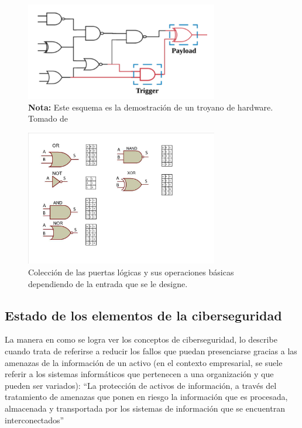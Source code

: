 \begin{figure}[htb]
  \centering
  \includegraphics[width=0.75\textwidth]{./pictures/circuit.png}
  \caption{
    \textbf{Nota:} Este esquema es la demostración de un troyano de hardware.
    Tomado de \cite{Chen2023}}
  \label{fig:circuit}
\end{figure} 

\begin{figure}[htb]
  \centering
  \includegraphics[width=0.75\textwidth]{./pictures/logic.png}
  \caption{
    Colección de las puertas lógicas y sus operaciones básicas dependiendo de la
    entrada que se le designe.
  }
  \label{fig:logic}
\end{figure} 

\subsection{Estado de los elementos de la ciberseguridad}

La manera en como se logra ver los conceptos de ciberseguridad, lo describe
\textcite{Mosquera2019} cuando trata de referirse a reducir los fallos que
puedan presenciarse gracias a las amenazas de la información de un activo (en
el contexto empresarial, se suele referir a los sistemas informáticos que
pertenecen a una organización y que pueden ser variados):
``La protección de activos de información, a través del tratamiento de amenazas
que ponen en riesgo la información que es procesada, almacenada y transportada
por los sistemas de información que se encuentran interconectados''
\parencite[Esic Business \& Marketing School, 2020, como se cita en][]{Bueno2022}

